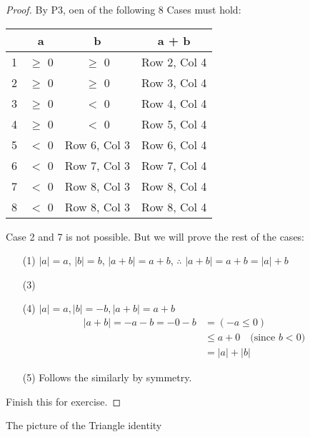 \documentclass[11pt]{article}
\begin{document}
\begin{proof}
	By P3, oen of the following 8 Cases must hold: \\
	\begin{center}

		\begin{tabular}{|c|c|c|c|}
			\hline
			  & a          & b            & a + b        \\ \hline
			1 & \(\geq\) 0 & \(\geq\) 0   & Row 2, Col 4 \\ \hline
			2 & \(\geq\) 0 & \(\geq\) 0   & Row 3, Col 4 \\ \hline
			3 & \(\geq\) 0 & \( < \) 0    & Row 4, Col 4 \\ \hline
			4 & \(\geq\) 0 & \( < \) 0    & Row 5, Col 4 \\ \hline
			5 & \(< \) 0   & Row 6, Col 3 & Row 6, Col 4 \\ \hline
			6 & \(< \) 0   & Row 7, Col 3 & Row 7, Col 4 \\ \hline
			7 & \(< \) 0   & Row 8, Col 3 & Row 8, Col 4 \\ \hline
			8 & \(< \) 0   & Row 8, Col 3 & Row 8, Col 4 \\ \hline
		\end{tabular}
	\end{center}
	Case 2 and 7 is not possible. But we will prove the rest of the cases:
	\begin{itemize}
		\item[(1)] \(|a| = a\), \(|b| = b\), \(|a + b| = a + b\), $\therefore$ \(|a + b| = a + b = |a| + b\)
		\item [(3)]
		\item [(4)] \(|a| = a, |b| = -b, |a + b| = a + b\)
		      \begin{align*}
			      |a + b| = - a- b = - 0 - b & = (-a \leq 0)                           \\
			                                 & \leq a + 0 \quad \text{(since $b < 0$)} \\
			                                 & = |a| + |b|
		      \end{align*}
		\item [(5)] Follows the similarly by symmetry.

	\end{itemize}
	Finish this for exercise.
\end{proof}
The picture of the Triangle identity
\begin{center}

\end{center}
\end{document}
